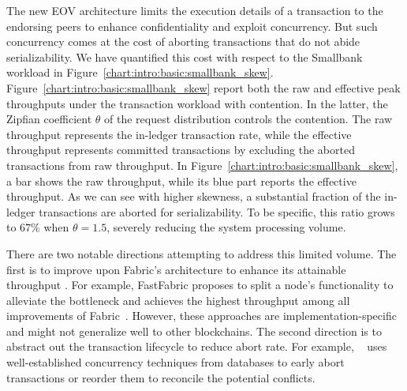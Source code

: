 The new EOV architecture limits the execution details of a transaction to the
endorsing peers to enhance confidentiality and exploit concurrency. But such
concurrency comes at the cost of aborting transactions that do not abide
%
serializability.
%
We have quantified this cost with respect to the Smallbank workload in Figure~\ref{chart:intro:basic:smallbank_skew}.
%
Figure~\ref{chart:intro:basic:smallbank_skew} report both the raw and effective peak throughputs under the transaction workload with contention. 
%
In the latter, the Zipfian coefficient $\theta$ of the request distribution controls the contention. 
%
The raw throughput represents the in-ledger transaction rate, while the effective throughput represents committed transactions by excluding the aborted transactions from raw throughput. 
%
In Figure~\ref{chart:intro:basic:smallbank_skew}, a bar shows the raw throughput, while its blue part reports the effective throughput. 
%
As we can see with higher skewness, a substantial fraction of the in-ledger transactions are aborted for serializability. 
%
To be specific, this ratio grows to $67$\% when $\theta=1.5$, severely reducing the system processing volume. 


There are two notable directions attempting to address this limited volume. 
%
The first is to improve upon Fabric's architecture to enhance its
attainable throughput \cite{nasir2018performance, thakkar2018performance}.
%
For example, FastFabric proposes to split a node's functionality to alleviate the bottleneck and achieves the highest throughput among all improvements of Fabric~\cite{gorenflo2019fastfabric}. 
%
However, these approaches are implementation-specific and might not generalize well
to other blockchains.
%
The second direction is to abstract out the transaction lifecycle to reduce
abort rate.
%
For example, {\fabricPlusplus}~\cite{sharma2019blurring} uses
well-established concurrency techniques from databases to early abort
transactions or reorder them to reconcile the potential conflicts.




